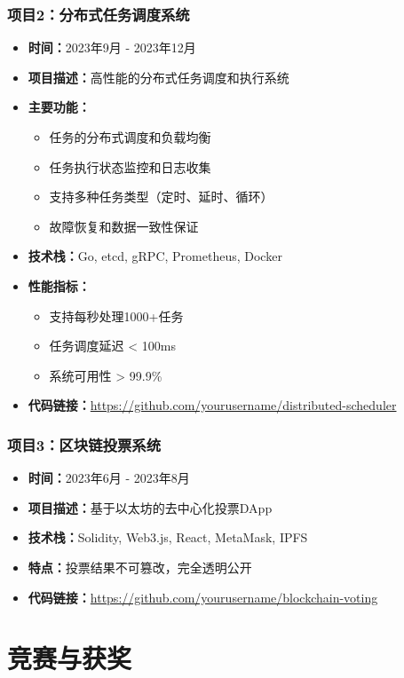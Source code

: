 \documentclass[a4paper,12pt]{article}
\begin{document}
\subsubsection{项目2：分布式任务调度系统}
\begin{itemize}
    \item \textbf{时间：}2023年9月 - 2023年12月
    \item \textbf{项目描述：}高性能的分布式任务调度和执行系统
    \item \textbf{主要功能：}
    \begin{itemize}
        \item 任务的分布式调度和负载均衡
        \item 任务执行状态监控和日志收集
        \item 支持多种任务类型（定时、延时、循环）
        \item 故障恢复和数据一致性保证
    \end{itemize}
    \item \textbf{技术栈：}Go, etcd, gRPC, Prometheus, Docker
    \item \textbf{性能指标：}
    \begin{itemize}
        \item 支持每秒处理1000+任务
        \item 任务调度延迟 < 100ms
        \item 系统可用性 > 99.9\%
    \end{itemize}
    \item \textbf{代码链接：}\url{https://github.com/yourusername/distributed-scheduler}
\end{itemize}

\subsubsection{项目3：区块链投票系统}
\begin{itemize}
    \item \textbf{时间：}2023年6月 - 2023年8月
    \item \textbf{项目描述：}基于以太坊的去中心化投票DApp
    \item \textbf{技术栈：}Solidity, Web3.js, React, MetaMask, IPFS
    \item \textbf{特点：}投票结果不可篡改，完全透明公开
    \item \textbf{代码链接：}\url{https://github.com/yourusername/blockchain-voting}
\end{itemize}

\section{竞赛与获奖}
\end{document}
